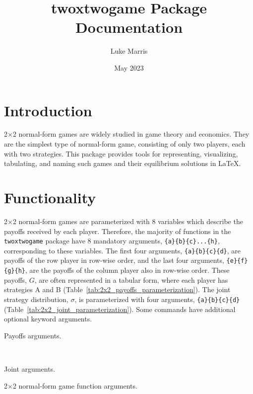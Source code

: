 \documentclass[10pt]{article}
\title{twoxtwogame Package Documentation}
\author{Luke Marris}
\date{May 2023}
\begin{document}
\maketitle

\section{Introduction}

2×2 normal-form games are widely studied in game theory and economics. They are the simplest type of normal-form game, consisting of only two players, each with two strategies. This package provides tools for representing, visualizing, tabulating, and naming such games and their equilibrium solutions in \LaTeX.


\section{Functionality}

2×2 normal-form games are parameterized with 8 variables which describe the payoffs received by each player. Therefore, the majority of functions in the \verb!twoxtwogame! package have 8 mandatory arguments, \verb!{a}{b}{c}...{h}!, corresponding to these variables. The first four arguments, \verb!{a}{b}{c}{d}!, are payoffs of the row player in row-wise order, and the last four arguments, \verb!{e}{f}{g}{h}!, are the payoffs of the column player also in row-wise order. These payoffs, $G$, are often represented in a tabular form, where each player has strategies A and B (Table~\ref{tab:2x2_payoffs_parameterization}). The joint strategy distribution, $\sigma$, is parameterized with four arguments, \verb!{a}{b}{c}{d}! (Table~\ref{tab:2x2_joint_parameterization}). Some commands have additional optional keyword arguments.

\begin{table}[h!]
    \centering
    \begin{subtable}[t]{0.4\linewidth}
        \centering
        \caption{Payoffs arguments.}
        \label{tab:2x2_payoffs_parameterization}
    \end{subtable}
    ~~~~
    \begin{subtable}[t]{0.4\linewidth}
        \centering
        \caption{Joint arguments.}
        \label{tab:2x2_joint_parameterization}
    \end{subtable}
    \caption{2×2 normal-form game function arguments.}
    \label{tab:2x2_parameterization}
\end{table}
\end{document}
